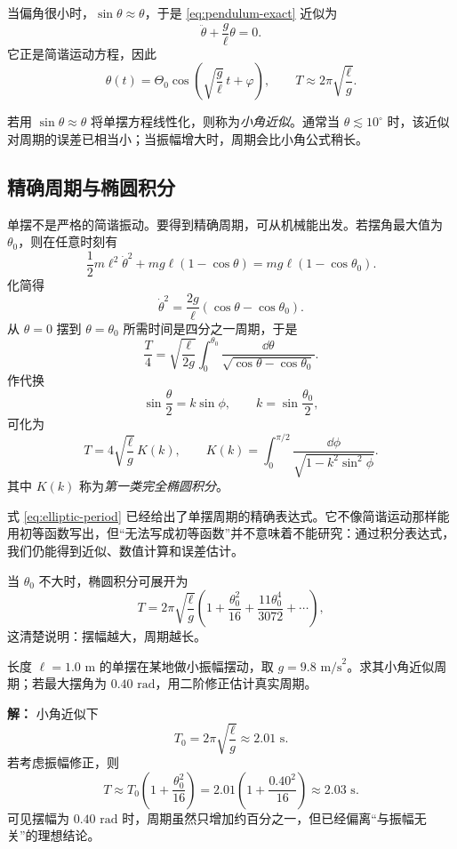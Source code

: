 当偏角很小时，$\sin\theta\approx\theta$，于是 \eqref{eq:pendulum-exact} 近似为
\begin{equation}
\ddot\theta+\frac{g}{\ell}\theta=0.
\label{eq:pendulum-small-angle}
\end{equation}
它正是简谐运动方程，因此
\[
\theta(t)=\Theta_0\cos\left(\sqrt{\frac{g}{\ell}}\,t+\varphi\right),
\qquad
T\approx 2\pi\sqrt{\frac{\ell}{g}}.
\]

\begin{definition}
若用 $\sin\theta\approx\theta$ 将单摆方程线性化，则称为\emph{小角近似}。通常当 $\theta\lesssim 10^\circ$ 时，该近似对周期的误差已相当小；当振幅增大时，周期会比小角公式稍长。
\end{definition}

\subsection{精确周期与椭圆积分}

单摆不是严格的简谐振动。要得到精确周期，可从机械能出发。若摆角最大值为 $\theta_0$，则在任意时刻有
\[
\frac12 m\ell^2\dot\theta^2+mg\ell(1-\cos\theta)=mg\ell(1-\cos\theta_0).
\]
化简得
\[
\dot\theta^2=\frac{2g}{\ell}(\cos\theta-\cos\theta_0).
\]
从 $\theta=0$ 摆到 $\theta=\theta_0$ 所需时间是四分之一周期，于是
\[
\frac{T}{4}=\sqrt{\frac{\ell}{2g}}\int_0^{\theta_0}\frac{\dd\theta}{\sqrt{\cos\theta-\cos\theta_0}}.
\]
作代换
\[
\sin\frac{\theta}{2}=k\sin\phi,
\qquad
k=\sin\frac{\theta_0}{2},
\]
可化为
\begin{equation}
T=4\sqrt{\frac{\ell}{g}}\,K(k),
\qquad
K(k)=\int_0^{\pi/2}\frac{\dd\phi}{\sqrt{1-k^2\sin^2\phi}}.
\label{eq:elliptic-period}
\end{equation}
其中 $K(k)$ 称为\emph{第一类完全椭圆积分}。

\begin{remark}
式 \eqref{eq:elliptic-period} 已经给出了单摆周期的精确表达式。它不像简谐运动那样能用初等函数写出，但“无法写成初等函数”并不意味着不能研究：通过积分表达式，我们仍能得到近似、数值计算和误差估计。
\end{remark}

当 $\theta_0$ 不大时，椭圆积分可展开为
\[
T=2\pi\sqrt{\frac{\ell}{g}}\left(1+\frac{\theta_0^2}{16}+\frac{11\theta_0^4}{3072}+\cdots\right),
\]
这清楚说明：摆幅越大，周期越长。

\begin{example}
长度 $\ell=1.0\text{ m}$ 的单摆在某地做小振幅摆动，取 $g=9.8\text{ m/s}^2$。求其小角近似周期；若最大摆角为 $0.40\text{ rad}$，用二阶修正估计真实周期。

\textbf{解：} 小角近似下
\[
T_0=2\pi\sqrt{\frac{\ell}{g}}\approx 2.01\text{ s}.
\]
若考虑振幅修正，则
\[
T\approx T_0\left(1+\frac{\theta_0^2}{16}\right)
=2.01\left(1+\frac{0.40^2}{16}\right)
\approx 2.03\text{ s}.
\]
可见摆幅为 $0.40\text{ rad}$ 时，周期虽然只增加约百分之一，但已经偏离“与振幅无关”的理想结论。
\end{example}

